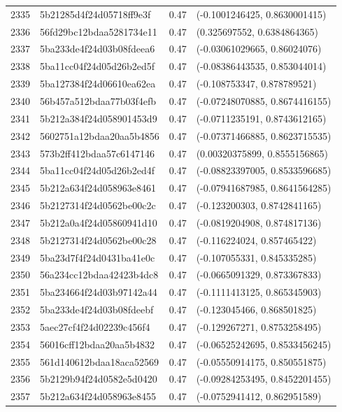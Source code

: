 \begin{table}[ht]
\begin{tabular}{rlrl}
  2335 & 5b21285d4f24d05718ff9e3f & 0.47 & (-0.1001246425, 0.8630001415) \\ 
  2336 & 56fd29bc12bdaa5281734e11 & 0.47 & (0.325697552, 0.6384864365) \\ 
  2337 & 5ba233de4f24d03b08fdeea6 & 0.47 & (-0.03061029665, 0.86024076) \\ 
  2338 & 5ba11cc04f24d05d26b2ed5f & 0.47 & (-0.08386443535, 0.853044014) \\ 
  2339 & 5ba127384f24d06610ea62ea & 0.47 & (-0.108753347, 0.878789521) \\ 
  2340 & 56b457a512bdaa77b03f4efb & 0.47 & (-0.07248070885, 0.8674416155) \\ 
  2341 & 5b212a384f24d058901453d9 & 0.47 & (-0.0711235191, 0.8743612165) \\ 
  2342 & 5602751a12bdaa20aa5b4856 & 0.47 & (-0.07371466885, 0.8623715535) \\ 
  2343 & 573b2ff412bdaa57c6147146 & 0.47 & (0.00320375899, 0.8555156865) \\ 
  2344 & 5ba11cc04f24d05d26b2ed4f & 0.47 & (-0.08823397005, 0.8533596685) \\ 
  2345 & 5b212a634f24d058963e8461 & 0.47 & (-0.07941687985, 0.8641564285) \\ 
  2346 & 5b2127314f24d0562be00c2c & 0.47 & (-0.123200303, 0.8742841165) \\ 
  2347 & 5b212a0a4f24d05860941d10 & 0.47 & (-0.0819204908, 0.874817136) \\ 
  2348 & 5b2127314f24d0562be00c28 & 0.47 & (-0.116224024, 0.857465422) \\ 
  2349 & 5ba23d7f4f24d0431ba41e0c & 0.47 & (-0.107055331, 0.845335285) \\ 
  2350 & 56a234cc12bdaa42423b4dc8 & 0.47 & (-0.0665091329, 0.873367833) \\ 
  2351 & 5ba234664f24d03b97142a44 & 0.47 & (-0.1111413125, 0.865345903) \\ 
  2352 & 5ba233de4f24d03b08fdeebf & 0.47 & (-0.123045466, 0.868501825) \\ 
  2353 & 5aec27cf4f24d02239c456f4 & 0.47 & (-0.129267271, 0.8753258495) \\ 
  2354 & 56016cff12bdaa20aa5b4832 & 0.47 & (-0.06525242695, 0.8533456245) \\ 
  2355 & 561d140612bdaa18aca52569 & 0.47 & (-0.05550914175, 0.850551875) \\ 
  2356 & 5b2129b94f24d0582e5d0420 & 0.47 & (-0.09284253495, 0.8452201455) \\ 
  2357 & 5b212a634f24d058963e8455 & 0.47 & (-0.0752941412, 0.862951589) \\ 

\end{tabular}
\end{table}
